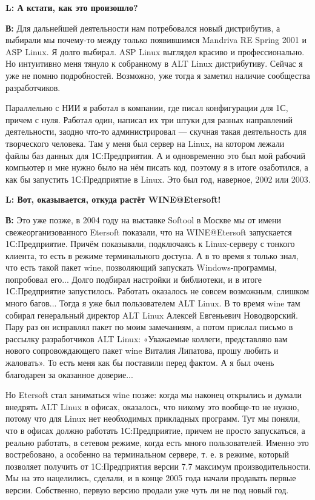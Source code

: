 \documentclass[10pt, a5paper]{article}
\begin{document}
{\noindent \bf L: А кстати, как это произошло?}

{\noindent \bf В:} Для дальнейшей деятельности нам потребовался новый дистрибутив, а выбирали мы почему-то между только появившимся Mandriva RE Spring 2001 и ASP Linux. Я долго выбирал. ASP Linux выглядел красиво и профессионально. Но интуитивно меня тянуло к собранному в ALT Linux дистрибутиву. Сейчас я уже не помню подробностей. Возможно, уже тогда я заметил наличие сообщества разработчиков.

Параллельно с НИИ я работал в компании, где  писал конфигурации для 1С, причем с нуля. Работал один, написал их три штуки для разных направлений деятельности, заодно что-то администрировал --- скучная такая деятельность для творческого человека. Там у меня был сервер на Linux, на котором лежали файлы баз данных для 1С:Предприятия. А и одновременно это был мой рабочий компьютер и мне нужно было на нём писать код, поэтому я в итоге озаботился, а как бы запустить 1С:Предприятие в Linux. Это был год, наверное, 2002 или 2003.  

{\noindent \bf L: Вот, оказывается, откуда растёт WINE@Etersoft!}

{\noindent \bf В:} Это уже позже, в 2004 году на выставке Softool в Москве мы от имени свежеорганизованного Etersoft показали, что на  WINE@Etersoft запускается 1С:Предприятие. Причём показывали, подключаясь к Linux-серверу с тонкого клиента, то есть в режиме терминального доступа. А в то время я только знал, что есть такой пакет wine, позволяющий запускать Windows-программы, попробовал его... Долго подбирал настройки и библиотеки, и в итоге 1С:Предприятие запустилось. Работать оказалось не совсем возможным, слишком много багов... Тогда я уже был пользователем ALT Linux. В то время wine там собирал генеральный директор ALT Linux Алексей Евгеньевич Новодворский. Пару раз он исправлял пакет по моим замечаниям, а потом прислал письмо в рассылку разработчиков ALT Linux: «Уважаемые коллеги, представляю вам нового сопровождающего пакет wine Виталия Липатова, прошу любить и жаловать». То есть меня как бы поставили перед фактом. А я был очень благодарен за оказанное доверие... 

Но Etersoft стал заниматься wine позже: когда мы наконец открылись и думали внедрять ALT Linux в офисах, оказалось, что никому это вообще-то не нужно, потому что для Linux нет необходимых прикладных программ. Тут мы поняли, что в офисах должно работать 1С:Предприятие, причем не просто запускаться, а реально работать, в сетевом режиме, когда есть много пользователей. Именно это востребовано, а особенно на терминальном сервере, т. е. в режиме, который позволяет получить от 1С:Предприятия версии 7.7 максимум производительности. Мы на это нацелились, сделали, и в конце 2005 года начали продавать первые версии. Собственно, первую версию продали уже чуть ли не под новый год.
\end{document}
